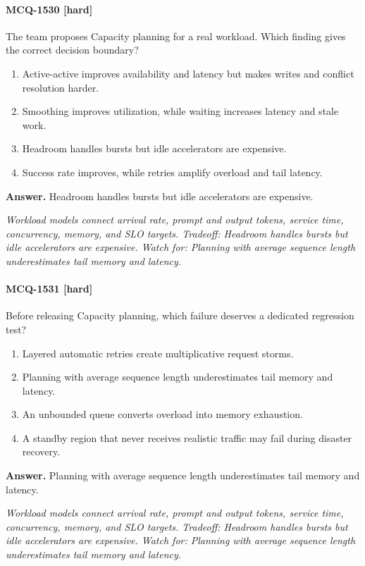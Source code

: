 \paragraph{MCQ-1530 [hard]} The team proposes Capacity planning for a real workload. Which finding gives the correct decision boundary?
\begin{enumerate}[label=\Alph*.]
\item Active-active improves availability and latency but makes writes and conflict resolution harder.
\item Smoothing improves utilization, while waiting increases latency and stale work.
\item Headroom handles bursts but idle accelerators are expensive.
\item Success rate improves, while retries amplify overload and tail latency.
\end{enumerate}
\noindent\textbf{Answer.} Headroom handles bursts but idle accelerators are expensive.
\par\textit{Workload models connect arrival rate, prompt and output tokens, service time, concurrency, memory, and SLO targets. Tradeoff: Headroom handles bursts but idle accelerators are expensive. Watch for: Planning with average sequence length underestimates tail memory and latency.}
\paragraph{MCQ-1531 [hard]} Before releasing Capacity planning, which failure deserves a dedicated regression test?
\begin{enumerate}[label=\Alph*.]
\item Layered automatic retries create multiplicative request storms.
\item Planning with average sequence length underestimates tail memory and latency.
\item An unbounded queue converts overload into memory exhaustion.
\item A standby region that never receives realistic traffic may fail during disaster recovery.
\end{enumerate}
\noindent\textbf{Answer.} Planning with average sequence length underestimates tail memory and latency.
\par\textit{Workload models connect arrival rate, prompt and output tokens, service time, concurrency, memory, and SLO targets. Tradeoff: Headroom handles bursts but idle accelerators are expensive. Watch for: Planning with average sequence length underestimates tail memory and latency.}
